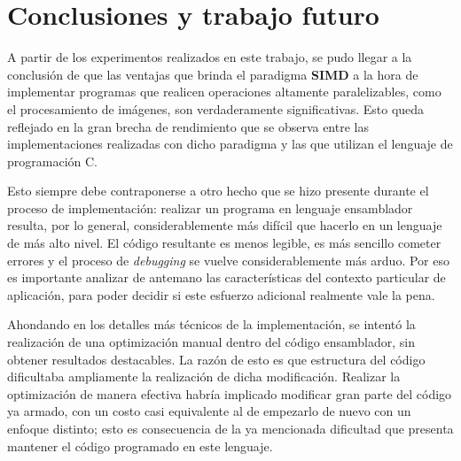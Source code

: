 \documentclass[a4paper]{article}
\newenvironment{codesnippet}{%
	\begin{Sbox}\begin{minipage}{\textwidth}\sffamily\small}%
	{\end{minipage}\end{Sbox}%
		\begin{center}%
		\vspace{-0.4cm}\colorbox{litegrey}{\TheSbox}\end{center}\vspace{0.3cm}}
\begin{document}







%
%

\section{Conclusiones y trabajo futuro}

    A partir de los experimentos realizados en este trabajo, se pudo llegar a la conclusión de que las ventajas que brinda el paradigma \textbf{SIMD} a la hora de implementar programas que realicen operaciones altamente paralelizables, como el procesamiento de imágenes, son verdaderamente significativas. Esto queda reflejado en la gran brecha de rendimiento que se observa entre las implementaciones realizadas con dicho paradigma y las que utilizan el lenguaje de programación C.

    Esto siempre debe contraponerse a otro hecho que se hizo presente durante el proceso de implementación: realizar un programa en lenguaje ensamblador resulta, por lo general, considerablemente más difícil que hacerlo en un lenguaje de más alto nivel. El código resultante es menos legible, es más sencillo cometer errores y el proceso de \emph{debugging} se vuelve considerablemente más arduo. Por eso es importante analizar de antemano las características del contexto particular de aplicación, para poder decidir si este esfuerzo adicional realmente vale la pena.

    Ahondando en los detalles más técnicos de la implementación, se intentó la realización de una optimización manual dentro del código ensamblador, sin obtener resultados destacables. La razón de esto es que estructura del código dificultaba ampliamente la realización de dicha modificación. Realizar la optimización de manera efectiva habría implicado modificar gran parte del código ya armado, con un costo casi equivalente al de empezarlo de nuevo con un enfoque distinto; esto es consecuencia de la ya mencionada dificultad que presenta mantener el código programado en este lenguaje.
\end{document}
